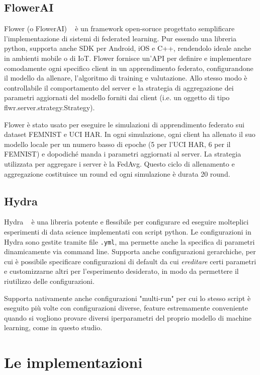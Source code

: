 \subsection{FlowerAI}
Flower (o FlowerAI) ~\cite{flowerai} è un framework open-soruce progettato semplificare
l'implementazione di sistemi di federated learning. Pur essendo una 
libreria python, supporta anche SDK per Android, iOS e C++, rendendolo 
ideale anche in ambienti mobile o di IoT.
Flower fornisce un'API per definire e implementare comodamente ogni 
specifico client in un apprendimento federato, configurandone il modello
da allenare, l'algoritmo di training e valutazione. Allo stesso modo è 
controllabile il comportamento del server e la strategia di aggregazione 
dei parametri aggiornati del modello forniti dai client  (i.e. un oggetto
di tipo flwr.server.strategy.Strategy).

Flower è stato usato per eseguire le simulazioni di apprendimento 
federato sui dataset FEMNIST e UCI HAR. In ogni simulazione, ogni client 
ha allenato il suo modello locale per un numero basso di epoche (5 per 
l'UCI HAR, 6 per il FEMNIST) e dopodiché manda i parametri aggiornati 
al server. La strategia utilizzata per aggregare i server è la
FedAvg. Questo ciclo  di allenamento e aggregazione 
costituisce un round ed ogni simulazione 
è durata 20 round.


\subsection{Hydra}
Hydra ~\cite{hydra} è una libreria potente e flessibile per configurare 
ed eseguire molteplici esperimenti di data science implementati con 
script python. Le configurazioni in Hydra sono gestite tramite file 
\texttt{.yml}, ma permette anche la specifica di parametri dinamicamente
via command line. Supporta anche configurazioni gerarchiche, per cui 
è possibile specificare configurazioni di default da cui \textit{ereditare}
certi parametri e customizzarne altri per l'esperimento desiderato, in 
modo da permettere il riutilizzo delle configurazioni.

Supporta nativamente anche configurazioni "multi-run" per cui lo stesso 
script è eseguito più volte con configurazioni diverse, feature 
estremamente conveniente quando si vogliono provare diversi iperparametri
del proprio modello di machine learning, come in questo studio.

\section{Le implementazioni}

